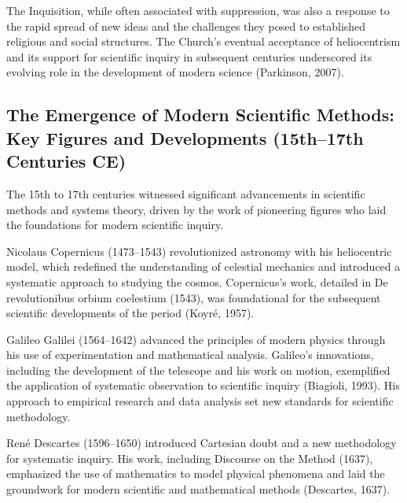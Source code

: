 \documentclass[twocolumn]{article}
\begin{document}
\textcolor{primary}{The Inquisition, while often associated with suppression, was also a response to the rapid spread of new ideas and the challenges they posed to established religious and social structures. The Church’s eventual acceptance of heliocentrism and its support for scientific inquiry in subsequent centuries underscored its evolving role in the development of modern science (Parkinson, 2007).}

\subsection{The Emergence of Modern Scientific Methods: Key Figures and Developments (15th–17th Centuries CE)}


\textcolor{primary}{The 15th to 17th centuries witnessed significant advancements in scientific methods and systems theory, driven by the work of pioneering figures who laid the foundations for modern scientific inquiry.}


\textcolor{secondary}{Nicolaus Copernicus (1473–1543) revolutionized astronomy with his heliocentric model, which redefined the understanding of celestial mechanics and introduced a systematic approach to studying the cosmos. Copernicus’s work, detailed in De revolutionibus orbium coelestium (1543), was foundational for the subsequent scientific developments of the period (Koyré, 1957).}

\textcolor{primary}{Galileo Galilei (1564–1642) advanced the principles of modern physics through his use of experimentation and mathematical analysis. Galileo’s innovations, including the development of the telescope and his work on motion, exemplified the application of systematic observation to scientific inquiry (Biagioli, 1993). His approach to empirical research and data analysis set new standards for scientific methodology.}

\textcolor{secondary}{René Descartes (1596–1650) introduced Cartesian doubt and a new methodology for systematic inquiry. His work, including Discourse on the Method (1637), emphasized the use of mathematics to model physical phenomena and laid the groundwork for modern scientific and mathematical methods (Descartes, 1637).}
\end{document}
